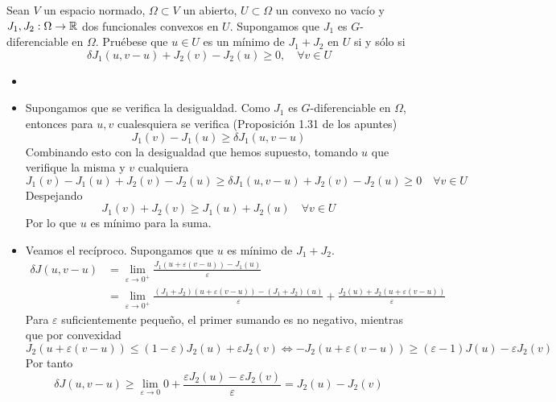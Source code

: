 \documentclass[twoside]{article}
\begin{document}
\newpage
\begin{ejercicio}{2}Sean $V$ un espacio normado, $\Omega ⊂ V$ un abierto, $U ⊂ \Omega $ un convexo no vacío y $J_1, J_2 : \Omega  \to \mathbb{R}$ dos funcionales convexos en $U$. Supongamos que $J_1$ es $G$-diferenciable en $\Omega $.
Pruébese que $u ∈ U$ es un mínimo de $J_1 + J_2$ en $U$ si y sólo si
$$
\delta J_1(u, v − u) + J_2(v) − J_2(u) ≥ 0, \quad ∀v ∈ U
$$
\end{ejercicio}
\begin{solucion}
\begin{itemize}
\item[]
\item Supongamos que se verifica la desigualdad. Como $J_1$ es $G$-diferenciable en $\Omega$, entonces para $u,v$ cualesquiera se verifica (Proposición 1.31 de los apuntes) 
$$
J_1(v)-J_1(u) \geq \delta J_1(u,v-u)
$$
Combinando esto con la desigualdad que hemos supuesto, tomando $u$ que verifique la misma y $v$ cualquiera
$$
J_1(v)-J_1(u)+J_2(v)-J_2(u)\geq \delta J_1(u, v − u) + J_2(v) − J_2(u) \geq 0 \quad \forall v \in U
$$
Despejando
$$
J_1(v)+J_2(v) \geq J_1(u)+J_2(u) \quad \forall v \in U
$$
Por lo que $u$ es mínimo para la suma.

\item Veamos el recíproco. Supongamos que $u$ es mínimo de $J_1+J_2$.
\begin{align*}
\delta J(u,v-u) &= \lim_{\varepsilon \to 0^+} \frac{J_1(u+\varepsilon(v-u))-J_1(u)}{\varepsilon}\\
&=\lim_{\varepsilon \to 0^+} \frac{(J_1+J_2)(u+\varepsilon(v-u))-(J_1+J_2)(u)}{\varepsilon}+\frac{J_2(u)+J_2(u+\varepsilon(v-u))}{\varepsilon}
\end{align*}
Para $\varepsilon$ suficientemente pequeño, el primer sumando es no negativo, mientras que por convexidad
$$
J_2(u+\varepsilon(v-u)) \leq (1-\varepsilon)J_2(u)+\varepsilon J_2(v) \Leftrightarrow -J_2(u+\varepsilon(v-u)) \geq (\varepsilon-1)J(u) - \varepsilon J_2(v)
$$
Por tanto
$$
\delta J(u,v-u) \geq \lim_{\varepsilon \to 0} 0 + \frac{\varepsilon J_2(u)-\varepsilon J_2(v)}{\varepsilon} = J_2(u)-J_2(v)
$$
\end{itemize}
\end{solucion}
\newpage
\end{document}
